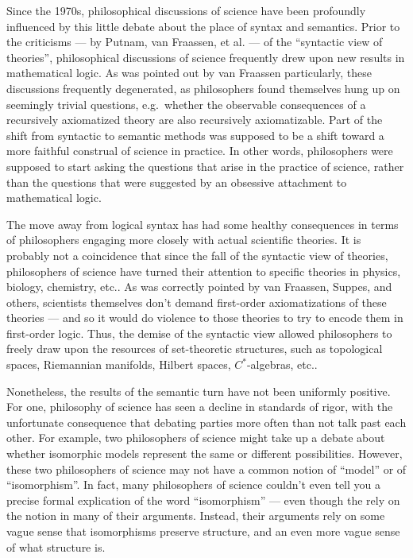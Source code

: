 Since the 1970s, philosophical discussions of science have been
profoundly influenced by this little debate about the place of syntax
and semantics.  Prior to the criticisms --- by Putnam, van Fraassen,
et al. --- of the ``syntactic view of theories'', philosophical
discussions of science frequently drew upon new results in
mathematical logic.  As was pointed out by van Fraassen particularly,
these discussions frequently degenerated, as philosophers found
themselves hung up on seemingly trivial questions, e.g.\ whether the
observable consequences of a recursively axiomatized theory are also
recursively axiomatizable.  Part of the shift from syntactic to
semantic methods was supposed to be a shift toward a more faithful
construal of science in practice.  In other words, philosophers were
supposed to start asking the questions that arise in the practice of
science, rather than the questions that were suggested by an obsessive
attachment to mathematical logic.

The move away from logical syntax has had some healthy consequences in
terms of philosophers engaging more closely with actual scientific
theories.  It is probably not a coincidence that since the fall of the
syntactic view of theories, philosophers of science have turned their
attention to specific theories in physics, biology, chemistry, etc..
As was correctly pointed by van Fraassen, Suppes, and others,
scientists themselves don't demand first-order axiomatizations of
these theories --- and so it would do violence to those theories to
try to encode them in first-order logic.  Thus, the demise of the
syntactic view allowed philosophers to freely draw upon the resources
of set-theoretic structures, such as topological spaces, Riemannian
manifolds, Hilbert spaces, $C^*$-algebras, etc..

Nonetheless, the results of the semantic turn have not been uniformly
positive.  For one, philosophy of science has seen a decline in
standards of rigor, with the unfortunate consequence that debating
parties more often than not talk past each other.  For example, two
philosophers of science might take up a debate about whether
isomorphic models represent the same or different possibilities.
However, these two philosophers of science may not have a common
notion of ``model'' or of ``isomorphism''.  In fact, many philosophers
of science couldn't even tell you a precise formal explication of the
word ``isomorphism'' --- even though the rely on the notion in many of
their arguments.  Instead, their arguments rely on some vague sense
that isomorphisms preserve structure, and an even more vague sense of
what structure is.

